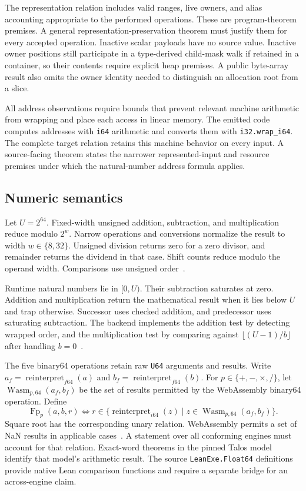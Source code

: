 \documentclass[11pt]{article}
\newcommand{\code}[1]{\texttt{#1}}
\begin{document}
The representation relation includes valid ranges, live owners, and alias accounting appropriate to the performed operations.  These are program-theorem premises.  A general representation-preservation theorem must justify them for every accepted operation.  Inactive scalar payloads have no source value.  Inactive owner positions still participate in a type-derived child-mask walk if retained in a container, so their contents require explicit heap premises.  A public byte-array result also omits the owner identity needed to distinguish an allocation root from a slice.

All address observations require bounds that prevent relevant machine arithmetic from wrapping and place each access in linear memory.  The emitted code computes addresses with \code{i64} arithmetic and converts them with \code{i32.wrap\_i64}.  The complete target relation retains this machine behavior on every input.  A source-facing theorem states the narrower represented-input and resource premises under which the natural-number address formula applies.

\subsection{Numeric semantics}

Let $U=2^{64}$.  Fixed-width unsigned addition, subtraction, and multiplication reduce modulo $2^w$.  Narrow operations and conversions normalize the result to width $w\in\{8,32\}$.  Unsigned division returns zero for a zero divisor, and remainder returns the dividend in that case.  Shift counts reduce modulo the operand width.  Comparisons use unsigned order~\cite{extract,binary}.

Runtime natural numbers lie in $[0,U)$.  Their subtraction saturates at zero.  Addition and multiplication return the mathematical result when it lies below $U$ and trap otherwise.  Successor uses checked addition, and predecessor uses saturating subtraction.  The backend implements the addition test by detecting wrapped order, and the multiplication test by comparing against $\lfloor(U-1)/b\rfloor$ after handling $b=0$~\cite{binary}.

The five binary64 operations retain raw \code{U64} arguments and results.  Write $a_f=\operatorname{reinterpret}_{f64}(a)$ and $b_f=\operatorname{reinterpret}_{f64}(b)$.  For $p\in\{+,-,\times,/\}$, let $\operatorname{Wasm}_{p,64}(a_f,b_f)$ be the set of results permitted by the WebAssembly binary64 operation.  Define
\[
\operatorname{Fp}_p(a,b,r)
\iff
r\in\{\operatorname{reinterpret}_{i64}(z)\mid
 z\in\operatorname{Wasm}_{p,64}(a_f,b_f)\}.
\]
Square root has the corresponding unary relation.  WebAssembly permits a set of NaN results in applicable cases~\cite{wasm}.  A statement over all conforming engines must account for that relation.  Exact-word theorems in the pinned Talos model identify that model's arithmetic result.  The source \code{LeanExe.Float64} definitions provide native Lean comparison functions and require a separate bridge for an across-engine claim.
\end{document}
